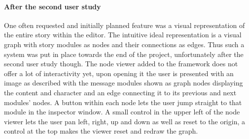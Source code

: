 \paragraph{After the second user study} One often requested and initially planned feature was a visual representation of the entire story within the editor. The intuitive ideal representation is a visual graph with story modules as nodes and their connections as edges. Thus such a system was put in place towards the end of the project, unfortunately after the second user study though. The node viewer added to the framework does not offer a lot of interactivity yet, upon opening it the user is presented with an image as described with the message modules shown as graph nodes displaying the content and character and an edge connecting it to its previous and next modules' nodes. A button within each node lets the user jump straight to that module in the inspector window. A small control in the upper left of the node viewer lets the user pan left, right, up and down as well as reset to the origin, a control at the top makes the viewer reset and redraw the graph.